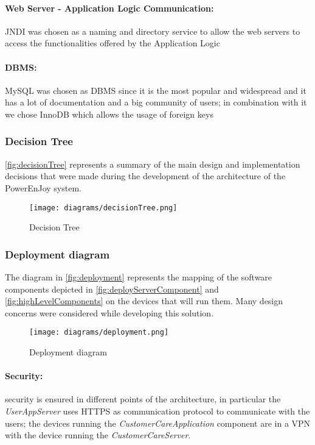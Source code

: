 \paragraph{Web Server - Application Logic Communication:} JNDI was chosen as a naming and directory service to allow the web servers to access the functionalities offered by the Application Logic
\paragraph{DBMS:} MySQL was chosen as DBMS since it is the most popular and widespread and it has a lot of documentation and a big community of users; in combination with it we chose InnoDB which allows the usage of foreign keys
\clearpage
\subsubsection{Decision Tree}
\autoref{fig:decisionTree} represents a summary of the main design and implementation decisions that were made during the development of the architecture of the PowerEnJoy system.\\

\begin{figure}[h!]
	\centering
	\texttt{[image: diagrams/decisionTree.png]}
	\caption{
		\label{fig:decisionTree}  
		Decision Tree
	}
\end{figure}
\clearpage
\subsubsection{Deployment diagram}

The diagram in \autoref{fig:deployment} represents the mapping of the software components depicted in \autoref{fig:deployServerComponent} and \autoref{fig:highLevelComponents} on the devices that will run them. Many design concerns were considered while developing this solution.\newline\newline\newline

\begin{figure}[ht!]
	\centering
	\texttt{[image: diagrams/deployment.png]}
	\caption{
		\label{fig:deployment} 
		Deployment diagram
	}
\end{figure}

\clearpage

\paragraph{Security:}security is ensured in different points of the architecture, in particular the \emph{UserAppServer} uses HTTPS as communication protocol to communicate with the users; the devices running the \emph{CustomerCareApplication} component are in a VPN with the device running the \emph{CustomerCareServer}.
